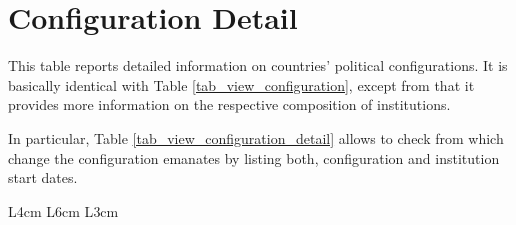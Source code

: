 \section{Configuration Detail}\label{sec_view_configuration_detail}

This table reports detailed information on countries' political configurations. It is basically identical with Table \ref{tab_view_configuration}, except from that it provides more information on the respective composition of institutions.

In particular, Table \ref{tab_view_configuration_detail} allows to check from which change the configuration emanates by listing both, configuration and institution start dates. 
\begin{center}
\begin{longtable}{L{4cm} L{6cm} L{3cm}}
\caption{Variables in Configuration Detail View\label{tab_view_configuration_detail}}


\end{longtable}
\end{center}
